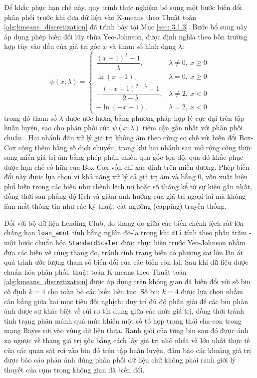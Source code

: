 Để khắc phục hạn chế này, quy trình thực nghiệm bổ sung một bước biến đổi phân phối trước khi đưa dữ liệu vào K-means theo Thuật toán \ref{alg:kmeans_discretization} đã trình bày tại Mục \ref{sec: 3.1.3}. Bước bổ sung này áp dụng phép biến đổi lũy thừa Yeo-Johnson, được định nghĩa theo bốn trường hợp tùy vào dấu của giá trị gốc $x$ và tham số hình dạng $\lambda$:
\begin{equation}
\psi(x; \lambda) =
\begin{cases}
\dfrac{(x+1)^{\lambda} - 1}{\lambda}, & \lambda \neq 0,\ x \geq 0 \\[8pt]
\ln(x+1), & \lambda = 0,\ x \geq 0 \\[8pt]
-\dfrac{(-x+1)^{2-\lambda} - 1}{2-\lambda}, & \lambda \neq 2,\ x < 0 \\[8pt]
-\ln(-x+1), & \lambda = 2,\ x < 0
\end{cases}
\label{eq:yeo_johnson}
\end{equation}
trong đó tham số $\lambda$ được ước lượng bằng phương pháp hợp lý cực đại trên tập huấn luyện, sao cho phân phối của $\psi(x;\lambda)$ tiệm cận gần nhất với phân phối chuẩn \citep{yeo2000}. Hai nhánh đầu xử lý giá trị không âm theo cùng cơ chế với biến đổi Box-Cox cộng thêm hằng số dịch chuyển, trong khi hai nhánh sau mở rộng công thức sang miền giá trị âm bằng phép phản chiếu qua gốc tọa độ, qua đó khắc phục được hạn chế cố hữu của Box-Cox vốn chỉ xác định trên miền dương. Phép biến đổi này được lựa chọn vì khả năng xử lý cả giá trị âm và bằng $0$, vốn xuất hiện phổ biến trong các biến như chênh lệch nợ hoặc số tháng kể từ sự kiện gần nhất, đồng thời san phẳng độ lệch và giảm ảnh hưởng của giá trị ngoại lai mà không làm mất thông tin như các kỹ thuật cắt ngưỡng (capping) truyền thống.

Đối với bộ dữ liệu Lending Club, do thang đo giữa các biến chênh lệch rất lớn - chẳng hạn \texttt{loan\_amnt} tính bằng nghìn đô-la trong khi \texttt{dti} tính theo phần trăm - một bước chuẩn hóa \texttt{StandardScaler} được thực hiện trước Yeo-Johnson nhằm đưa các biến về cùng thang đo, tránh tình trạng biến có phương sai lớn lấn át quá trình ước lượng tham số biến đổi của các biến còn lại. Sau khi dữ liệu được chuẩn hóa phân phối, thuật toán K-means theo Thuật toán \ref{alg:kmeans_discretization} được áp dụng trên không gian đã biến đổi với số bin cố định $k = 4$ cho toàn bộ các biến liên tục. Số bin $k = 4$ được lựa chọn nhằm cân bằng giữa hai mục tiêu đối nghịch: duy trì đủ độ phân giải để các bin phản ánh được sự khác biệt về rủi ro tín dụng giữa các mức giá trị, đồng thời tránh tình trạng phân mảnh quá mức khiến một số tổ hợp trạng thái cha-con trong mạng Bayes rơi vào vùng dữ liệu thưa. Ranh giới của từng bin sau đó được ánh xạ ngược về thang giá trị gốc bằng cách lấy giá trị nhỏ nhất và lớn nhất thực tế của các quan sát rơi vào bin đó trên tập huấn luyện, đảm bảo các khoảng giá trị được báo cáo phản ánh đúng phân phối dữ liệu chứ không phải ranh giới lý thuyết của cụm trong không gian đã biến đổi.

